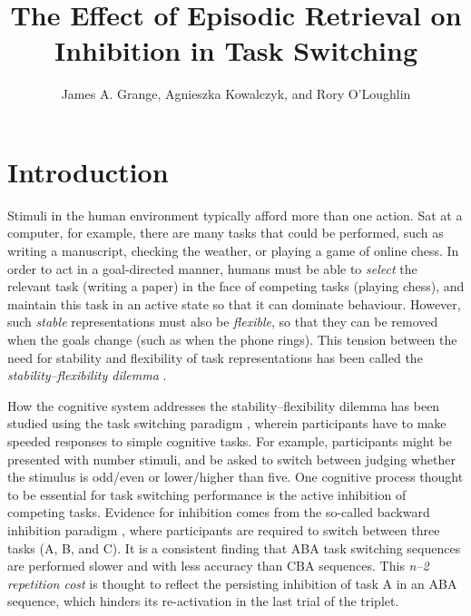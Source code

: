 \documentclass[a4paper, doc, natbib]{apa6}
\title{The Effect of Episodic Retrieval on Inhibition in Task Switching}
\author{James A. Grange, Agnieszka Kowalczyk, and Rory O'Loughlin}
\affiliation{School of Psychology, Keele University, UK}
\begin{document}
\maketitle

\section{Introduction}

Stimuli in the human environment typically afford more than one action. Sat at a computer, for example, there are many tasks that could be performed, such as writing a manuscript, checking the weather, or playing a game of online chess. In order to act in a goal-directed manner, humans must be able to \emph{select} the relevant task (writing a paper) in the face of competing tasks (playing chess), and maintain this task in an active state so that it can dominate behaviour. However, such \emph{stable} representations must also be \emph{flexible}, so that they can be removed when the goals change (such as when the phone rings). This tension between the need for stability and flexibility of task representations has been called the \emph{stability--flexibility dilemma} \citep{Goschke2000}. 

How the cognitive system addresses the stability--flexibility dilemma has been studied using the task switching paradigm \citep{Grange2014a,Kiesel2010,Vandierendonck2010}, wherein participants have to make speeded responses to simple cognitive tasks. For example, participants might be presented with number stimuli, and be asked to switch between judging whether the stimulus is odd/even or lower/higher than five. One cognitive process thought to be essential for task switching performance is the active inhibition of competing tasks. Evidence for inhibition comes from the so-called backward inhibition paradigm \citep{Koch2010, Mayr2000}, where participants are required to switch between three tasks (A, B, and C). 
It is a consistent finding that ABA task switching sequences are performed slower and with less accuracy than CBA sequences. This \emph{n--2 repetition cost} is thought to reflect the persisting inhibition of task A in an ABA sequence, which hinders its re-activation in the last trial of the triplet.
\end{document}
